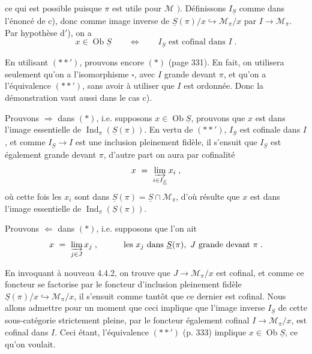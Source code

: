 \documentclass[11pt]{article}
\newcommand{\printedpage}[1]{\marginpar{\footnotesize p.~#1}}
\newcommand{\msp}[1]{\marginpar{\footnotesize [#1]}}
\DeclareMathOperator{\Ob}{Ob}
\DeclareMathOperator{\Ind}{Ind}
\begin{document}
ce qui est possible puisque $\pi$ est utile pour $\mathcal{M}$ $\Bigg)$. Définissons $I_{\underline{S}}$ comme dans l'énoncé de c), donc comme image inverse de $\underline{S}(\pi)/x \hookrightarrow \mathcal{M}_\pi/x$ par $I \longrightarrow \mathcal{M}_\pi$. Par hypothèse d$'$), on a
\[
x \in \Ob\underline{S} \qquad \Longleftrightarrow \qquad I_{\underline{S}} \text{ est cofinal dans } I \; . \tag*{$(**')$}
\]

En utilisant $(**')$, prouvons encore $(*)$ (page 331). En fait, on utilisera seulement qu'on a
\msp{page 334}
l'isomorphisme $\square$, avec $I$ grande devant $\pi$, et qu'on a l'équivalence $(**')$, sans avoir à utiliser que $I$ est ordonnée. Donc la démonstration vaut aussi dans le cas c).

Prouvons $\Longrightarrow$ dans $(*)$, i.e. supposons $x \in \Ob\underline{S}$, prouvons que $x$ est dans l'image essentielle de $\Ind_\pi(\underline{S}(\pi))$. En vertu de $(**')$, $I_{\underline{S}}$ est cofinale dans $I$, et comme $I_{\underline{S}} \longrightarrow I$ est une inclusion pleinement fidèle, il s'ensuit que $I_{\underline{S}}$ est également grande devant $\pi$, d'autre part on aura par cofinalité
\[
x \ = \ \varinjlim_{i\in I_{\underline{S}}} x_i \; ,
\]
où cette fois les $x_i$ sont dans $\underline{S}(\pi) = \underline{S}\cap\mathcal{M}_\pi$, d'où résulte que $x$ est dans l'image essentielle de $\Ind_\pi(\underline{S}(\pi))$.

Prouvons $\Longleftarrow$ dans $(*)$, i.e. supposons que l'on ait
\[
x \ = \ \varinjlim_{j\in J} x_j \; , \qquad\quad \text{les } x_j \text{ dans } \underline{S}(\pi),\ J \text{ grande devant } \pi \; .
\]

\printedpage{127}

\msp{page 335}

En invoquant à nouveau 4.4.2, on trouve que $J \longrightarrow \mathcal{M}_\pi/x$ est cofinal, et comme ce foncteur se factorise par le foncteur d'inclusion pleinement fidèle $\underline{S}(\pi)/x \hookrightarrow \mathcal{M}_\pi/x$, il s'ensuit comme tantôt que ce dernier est cofinal. Nous allons admettre pour un moment que ceci implique que l'image inverse $I_{\underline{S}}$ de cette sous-catégorie strictement pleine, par le foncteur également cofinal $I \longrightarrow \mathcal{M}_\pi/x$, est cofinal dans $I$. Ceci étant, l'équivalence $(**')$ (p. 333) implique $x \in \Ob\underline{S}$, ce qu'on voulait.
\end{document}
